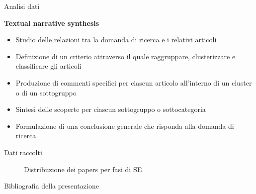 \documentclass{beamer}
\begin{document}
\begin{frame}[t]{\centerline{Analisi dati}}

  \centering
  {\fontsize{16}{22}\textbf{\textcolor{myyellow}{Textual narrative synthesis  \cite{Lucas2007}}}}
\vspace{1cm}
  \begin{itemize}
      \item Studio delle relazioni tra la domanda di ricerca e i relativi articoli
\item Definizione di un criterio attraverso il quale raggruppare, clusterizzare e classificare gli articoli
\item Produzione di commenti specifici per ciascun articolo all'interno di un cluster o di un sottogruppo
\item Sintesi delle scoperte per ciascun sottogruppo o sottocategoria
\item Formulazione di una conclusione generale che risponda alla domanda di ricerca
  \end{itemize}


\end{frame}
\begin{frame}[t]{\centerline{Dati raccolti}}
\begin{figure}[htbp]
    \centering
    \caption{Distribuzione dei papers per fasi di SE}
    \label{fig:distribution}
\end{figure}
\end{frame}
\tiny
\begin{frame}{\centerline{Bibliografia della presentazione}}
\begin{multicols}{2}


\end{multicols}
\end{frame}
\end{document}
